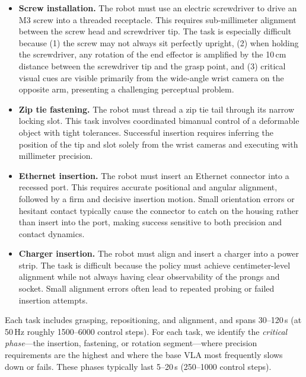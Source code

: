 \begin{itemize}[leftmargin=*, itemsep=2pt]
    \item \textbf{Screw installation.} The robot must use an electric screwdriver to drive an M3 screw into a threaded receptacle. This requires sub-millimeter alignment between the screw head and screwdriver tip. The task is especially difficult because (1) the screw may not always sit perfectly upright, (2) when holding the screwdriver, any rotation of the end effector is amplified by the 10\,cm distance between the screwdriver tip and the grasp point, and (3) critical visual cues are visible primarily from the wide-angle wrist camera on the opposite arm, presenting a challenging perceptual problem.
    
    \item \textbf{Zip tie fastening.} The robot must thread a zip tie tail through its narrow locking slot. This task involves coordinated bimanual control of a deformable object with tight tolerances. Successful insertion requires inferring the position of the tip and slot solely from the wrist cameras and executing with millimeter precision.
    
    \item \textbf{Ethernet insertion.} The robot must insert an Ethernet connector into a recessed port. This requires accurate positional and angular alignment, followed by a firm and decisive insertion motion. Small orientation errors or hesitant contact typically cause the connector to catch on the housing rather than insert into the port, making success sensitive to both precision and contact dynamics.
    
    \item \textbf{Charger insertion.} The robot must align and insert a charger into a power strip. The task is difficult because the policy must achieve centimeter-level alignment while not always having clear observability of the prongs and socket. Small alignment errors often lead to repeated probing or failed insertion attempts.

\end{itemize}

Each task includes grasping, repositioning, and alignment, and spans 30--120\,s (at 50\,Hz roughly 1500--6000 control steps). For each task, we identify the \emph{critical phase}---the insertion, fastening, or rotation segment---where precision requirements are the highest and where the base VLA most frequently slows down or fails. These phases typically last 5--20\,s (250--1000 control steps). 

